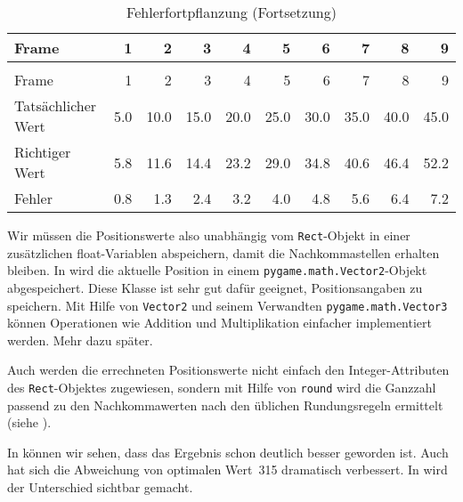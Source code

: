 \begin{longtable}{lrrrrrrrrr}
	\caption{Fehlerfortpflanzung}\label{tabFpsBewegung04} \\[1em]
    Frame & 1 & 2  & 3  & 4 & 5 &  6 & 7 & 8 & 9 \\[0.5em]\hline\hline
	\hline
	\endfirsthead %
	\caption{Fehlerfortpflanzung (Fortsetzung)}\\[1em]
    Frame & 1 & 2  & 3  & 4 & 5 &  6 & 7 & 8 & 9 \\[0.5em]\hline\hline
	\hline
	\endhead %
	Tatsächlicher Wert  & 5.0 & 10.0 & 15.0 & 20.0 & 25.0 & 30.0 & 35.0 & 40.0 & 45.0 \\ \hline
	Richtiger Wert      & 5.8 & 11.6 & 14.4 & 23.2 & 29.0 & 34.8 & 40.6 & 46.4 & 52.2 \\ \hline
	Fehler              & 0.8 & 1.3 & 2.4 & 3.2 & 4.0 & 4.8 & 5.6 & 6.4 & 7.2 \\ \hline
\end{longtable} 

Wir müssen die Positionswerte also unabhängig vom \texttt{Rect}-Objekt in einer zusätzlichen float-Variablen abspeichern, damit die Nachkommastellen erhalten bleiben. In  wird die aktuelle Position in einem \texttt{pygame.math.Vector2}-Objekt abgespeichert. Diese Klasse ist sehr gut dafür geeignet, Positionsangaben zu speichern. Mit Hilfe von \texttt{Vector2} und seinem Verwandten \texttt{pygame.math.Vector3} können Operationen wie Addition und Multiplikation einfacher implementiert werden. Mehr dazu später. 

\newpage
Auch werden die errechneten Positionswerte nicht einfach den Integer-Attributen des \texttt{Rect}-Objektes zugewiesen, sondern mit Hilfe von \texttt{round} wird die Ganzzahl passend zu den Nachkommawerten nach den üblichen Rundungsregeln ermittelt (siehe ). 



In   können wir sehen, dass das Ergebnis schon deutlich besser geworden ist. Auch hat sich die Abweichung von optimalen Wert~315 dramatisch verbessert. In  wird der Unterschied sichtbar gemacht.

